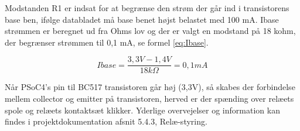 Modstanden R1 er indsat for at begrænse den strøm der går ind i transistorens base ben, ifølge databladet må base benet højst belastet med 100 mA. Ibase strømmen er beregnet ud fra Ohms lov og der er valgt en modstand på 18 kohm, der begrænser strømmen til 0,1 mA, se formel \ref{eq:Ibase}.

\begin{equation} 
Ibase = \frac{3,3V - 1,4V}{18k\Omega} = 0,1mA
\label{eq:Ibase}
\end{equation} 

Når PSoC4’s pin til BC517 transistoren går høj (3,3V), så skabes der forbindelse mellem collector og emitter på transistoren, herved er der spænding over relæets spole og relæets kontaktsæt klikker. Yderlige overvejelser og information kan findes i projektdokumentation afsnit 5.4.3, Relæ-styring.





